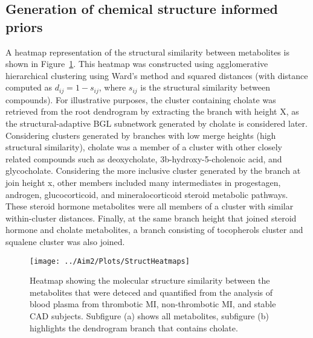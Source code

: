 \begin{DoubleSpace*}
\section{Generation of chemical structure informed priors}
A heatmap representation of the structural similarity between metabolites is shown in Figure~\ref{fig:heatmap}. This heatmap was constructed using agglomerative hierarchical clustering using Ward’s method and squared distances (with distance computed as $d_{ij}=1-s_{ij}$, where $s_{ij}$ is the structural similarity between compounds). For illustrative purposes, the cluster containing cholate was retrieved from the root dendrogram by extracting the branch with height X, as the structural-adaptive BGL subnetwork generated by cholate is considered later. Considering clusters generated by branches with low merge heights (high structural similarity), cholate was a member of a cluster with other closely related compounds such as deoxycholate, 3b-hydroxy-5-cholenoic acid, and glycocholate. Considering the more inclusive cluster generated by the branch at join height x, other members included many intermediates in progestagen, androgen, glucocorticoid, and mineralocorticoid steroid metabolic pathways. These steroid hormone metabolites were all members of a cluster with similar within-cluster distances. Finally, at the same branch height that joined steroid hormone and cholate metabolites, a branch consisting of tocopherols cluster and squalene cluster was also joined.
\end{DoubleSpace*}

\newpage
{}
\recalctypearea
\begin{figure}[H]
	\texttt{[image: ../Aim2/Plots/StructHeatmaps]}
	\caption[Heatmap showing the molecular structure similarity between the metabolites that were deteced and quantified from the analysis of blood plasma from thrombotic MI, non-thrombotic MI, and stable CAD subjects]{\DoubleSpacing Heatmap showing the molecular structure similarity between the metabolites that were deteced and quantified from the analysis of blood plasma from thrombotic MI, non-thrombotic MI, and stable CAD subjects. Subfigure (a) shows all metabolites, subfigure (b) highlights the dendrogram branch that contains cholate. \label{fig:heatmap} }
\end{figure}
\newpage
{}
\recalctypearea

